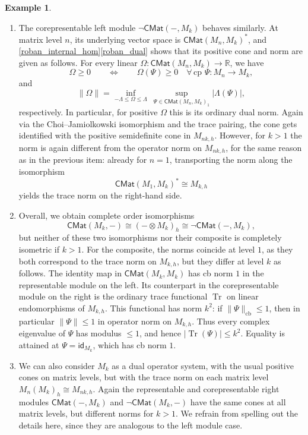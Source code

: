 \documentclass[11pt,onecolumn]{article}
\newcommand{\R}{\mathbb{R}}
\newcommand{\id}{\mathsf{id}}
\newcommand{\OpSys}{\mathsf{OpSys}}
\theoremstyle{plain}
\theoremstyle{remark}
\theoremstyle{definition}
\newtheorem{example}[example]{Example}
\begin{document}
\begin{example}
\begin{enumerate}
			Overall, the systems $M_k$ and $\mathsf{CMat}(M_k,-)$ are completely order isomorphic, but for $k > 1$ not isomorphic in $\OpSys$.
		\item\label{item:cmat_left_modules_matrices}
			The corepresentable left module $\neg\mathsf{CMat}(-,M_k)$ behaves similarly.
			At matrix level $n$, its underlying vector space is $\mathsf{CMat}(M_n,M_k)^*$,
			and \cref{roban_internal_hom}\ref{roban_dual} shows that its positive cone and norm are given as follows.
			For every linear $\Omega \colon \mathsf{CMat}(M_n,M_k) \to \R$, we have
			\[
				\Omega \ge 0
				\qquad
				\Longleftrightarrow
				\qquad
				\Omega(\Psi) \ge 0 \quad \forall \, \textrm{cp } \Psi \colon M_n \to M_k,
			\]
			and
			\[
				\|\Omega\|
				=
				\inf_{-\Lambda \le \Omega \le \Lambda}
				\ \sup_{\Psi \in \mathsf{CMat}(M_n,M_k)_1}
				|\Lambda(\Psi)|,
			\]
			respectively.
			In particular, for positive $\Omega$ this is its ordinary dual norm.
			Again via the Choi--Jamiolkowski isomorphism and the trace pairing,
			the cone gets identified with the positive semidefinite cone in $M_{nk,h}$.
			However, for $k > 1$ the norm is again different from the operator norm on $M_{nk,h}$, for the same reason as in the previous item:
			already for $n=1$, transporting the norm along the isomorphism
			\[
				\mathsf{CMat}(M_1,M_k)^* \cong M_{k,h}
			\]
			yields the trace norm on the right-hand side.
		\item
			Overall, we obtain complete order isomorphisms
			\[
				\mathsf{CMat}(M_k, -)
				\cong
				(- \otimes M_k)_h
				\cong
				\neg\mathsf{CMat}(-, M_k),
			\]
			but neither of these two isomorphisms nor their composite is completely isometric if $k > 1$.
			For the composite, the norms coincide at level $1$, as they both correspond to the trace norm on $M_{k,h}$,
			but they differ at level $k$ as follows.
			The identity map in $\mathsf{CMat}(M_k,M_k)$ has cb norm $1$ in the representable module on the left.
			Its counterpart in the corepresentable module on the right is the ordinary trace functional $\operatorname{Tr}$ on linear endomorphisms of $M_{k,h}$.
			This functional has norm $k^2$:
			if $\|\Psi\|_{\mathrm{cb}} \le 1$, then in particular $\|\Psi\| \le 1$ in operator norm on $M_{k,h}$.
			Thus every complex eigenvalue of $\Psi$ has modulus $\le 1$, and hence $|\operatorname{Tr}(\Psi)| \le k^2$.
			Equality is attained at $\Psi = \id_{M_k}$, which has cb norm $1$.
		\item
			\label{item:cmat_right_modules_matrices}
			We can also consider $M_k$ as a dual operator system, with the usual positive cones on matrix levels, but with the trace norm on each matrix level $M_n(M_k)_h \cong M_{nk,h}$.
			Again the representable and corepresentable right modules $\mathsf{CMat}(-,M_k)$ and $\neg\mathsf{CMat}(M_k,-)$ have the same cones at all matrix levels, but different norms for $k > 1$.
			We refrain from spelling out the details here, since they are analogous to the left module case.
	\end{enumerate}
\end{example}
\end{document}
